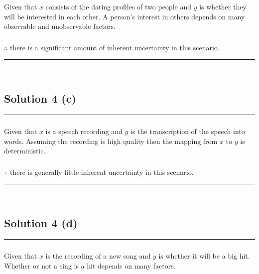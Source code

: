 \documentclass{article}
\begin{document}
\subsubsection*{}
\parbox{\textwidth}{
Given that $x$ consists of the dating profiles of two people and $y$ is whether they will be interested in each other. A person's interest in others depends on many observable and unobservable factors. 
}

\subsubsection*{\normalfont}{$\therefore$ there is a significant amount of inherent uncertainty in this scenario.}

\noindent\rule{\textwidth}{0.4pt}\\

\newpage

\subsection*{Solution 4 (c)}
\noindent\rule{\textwidth}{0.4pt}
\subsubsection*{}
\parbox{\textwidth}{
Given that $x$ is a speech recording and $y$ is the transcription of the speech into words. Assuming the recording is high quality then the mapping from $x$ to $y$ is deterministic. 
}

\subsubsection*{\normalfont}{$\therefore$ there is generally little inherent uncertainty in this scenario.}

\noindent\rule{\textwidth}{0.4pt}\\

\newpage

\subsection*{Solution 4 (d)}
\noindent\rule{\textwidth}{0.4pt}

\subsubsection*{}
\parbox{\textwidth}{
Given that $x$ is the recording of a new song and $y$ is whether it will be a big hit. Whether or not a sing is a hit depends on many factors.
}
\end{document}
